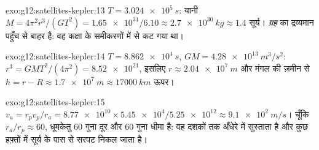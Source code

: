 \begin{solution}{exo:g12:satellites-kepler:13}
$T = \qty{3.024e5}{s}$: यानी $M = 4\pi^2 r^3/(GT^2) =
\num{1.65e31}/6.10 \approx \qty{2.7e30}{kg} \approx 1.4$ सूर्य। \emph{ग्रह} का द्रव्यमान पहुँच से बाहर है: वह
कक्षा के समीकरणों में से कट गया था।
\end{solution}

\begin{solution}{exo:g12:satellites-kepler:14}
$T = \qty{8.862e4}{s}$, $GM = \qty{4.28e13}{m^3/s^2}$: $r^3 = GMT^2/(4\pi^2) = \num{8.52e21}$, इसलिए $r \approx
\qty{2.04e7}{m}$ और मंगल की ज़मीन से $h = r - R \approx \qty{1.7e7}{m} \approx
\qty{17000}{km}$ ऊपर।
\end{solution}

\begin{solution}{exo:g12:satellites-kepler:15}
$v_a = r_p v_p / r_a = \num{8.77e10} \times \num{5.45e4} /
\num{5.25e12} \approx \qty{9.1e2}{m/s}$। चूँकि $r_a/r_p \approx 60$, धूमकेतु $60$ गुना दूर और $60$ गुना धीमा है: वह दशकों
तक अँधेरे में सुस्ताता है और कुछ हफ़्तों में सूर्य के पास से सरपट निकल जाता है।
\end{solution}


